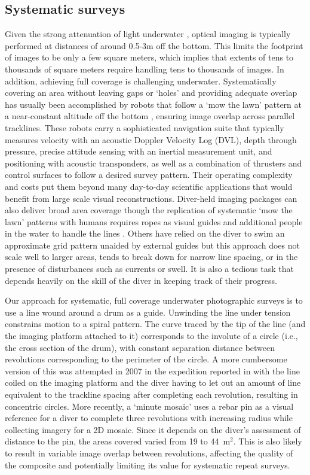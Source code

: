 \subsection{Systematic surveys}
Given the strong attenuation of light underwater \cite{Duntley_1963}, optical imaging is typically performed at distances of around 0.5-3m off the bottom. This limits the footprint of images to be only a few square meters, which implies that extents of tens to thousands of square meters require handling tens to thousands of images. In addition, achieving full coverage is challenging underwater. Systematically covering an area without leaving gaps or `holes' and providing adequate overlap has usually been accomplished by robots that follow a `mow the lawn' pattern at a near-constant altitude off the bottom \cite{Bingham_2010}\cite{Williams_2010}, ensuring image overlap across parallel tracklines. These robots carry a sophisticated navigation suite that typically measures velocity with an acoustic Doppler Velocity Log (DVL), depth through pressure, precise attitude sensing with an inertial measurement unit, and positioning with acoustic transponders, as well as a combination of thrusters and control surfaces to follow a desired survey pattern. Their operating complexity and costs put them beyond many day-to-day scientific applications that would benefit from large scale visual reconstructions.
Diver-held imaging packages can also deliver broad area coverage though the replication of systematic `mow the lawn' patterns with humans requires ropes as visual guides and additional people in the water to handle the lines \cite{Henderson_2013}. Others \cite{Burns_2015} have relied on the diver to swim an approximate grid pattern unaided by external guides but this approach does not scale well to larger areas, tends to break down for narrow line spacing, or in the presence of disturbances such as currents or swell. It is also a tedious task that depends heavily on the skill of the diver in keeping track of their progress.

Our approach for systematic, full coverage underwater photographic surveys is to use a line wound around a drum as a guide. Unwinding the line under tension constrains motion to a spiral pattern. The curve traced by the tip of the line (and the imaging platform attached to it) corresponds to the involute of a circle (i.e., the cross section of the drum), with constant separation distance between revolutions corresponding to the perimeter of the circle. A more cumbersome version of this was attempted in 2007 in the expedition reported in \cite{Camilli_2007} with the line coiled on the imaging platform and the diver having to let out an amount of line equivalent to the trackline spacing after completing each revolution, resulting in concentric circles. More recently, a `minute mosaic' \cite{gintert2012third} uses a rebar pin as a visual reference for a diver to complete three revolutions with increasing radius while collecting imagery for a 2D mosaic. Since it depends on the diver's assessment of distance to the pin, the areas covered varied from 19 to 44~m$^{2}$. This is also likely to result in variable image overlap between revolutions, affecting the quality of the composite and potentially limiting its value for systematic repeat surveys.

